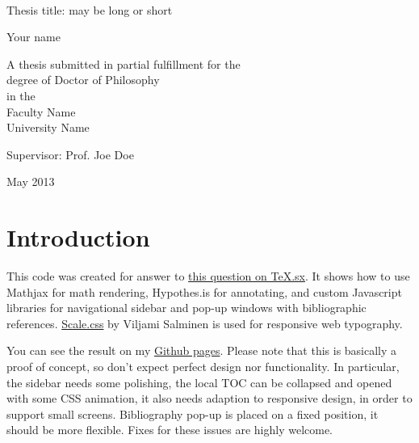 \documentclass[11pt,a4paper,oldfontcommands]{memoir}
\begin{document}
%
%
\thispagestyle{empty}

{%
\sffamily
\centering
\Large

~\vspace{\fill}

{\huge 
Thesis title: may be long or short
}

\vspace{2.5cm}

{\LARGE
Your name
}

\vspace{3.5cm}

A thesis submitted in partial fulfillment for the\\
degree of Doctor of Philosophy\\[1em]
in the\\[1em]
Faculty Name\\
University Name

\vspace{3.5cm}

Supervisor: Prof. Joe Doe

\vspace{\fill}

May 2013

}%

\cleardoublepage


\tableofcontents*


\clearpage

\chapter{Introduction}


This code was created for answer to
\href{http://tex.stackexchange.com/q/237566/2891}{this question on
  TeX.sx}. It shows how to use Mathjax for math rendering, Hypothes.is for
annotating, and custom Javascript libraries for navigational sidebar and
pop-up windows with bibliographic references.
\href{https://github.com/viljamis/Scale}{Scale.css} by Viljami Salminen
is used for responsive web typography.

You can see the result on my
\href{http://michal-h21.github.io/reyman/thesis.html}{Github pages}.
Please note that this is basically a proof of concept, so don't expect
perfect design nor functionality. In particular, the sidebar needs some
polishing, the local TOC can be collapsed and opened with some CSS
animation, it also needs adaption to responsive design, in order to
support small screens. Bibliography pop-up is placed on a fixed
position, it should be more flexible. Fixes for these issues are highly
welcome.
\end{document}

